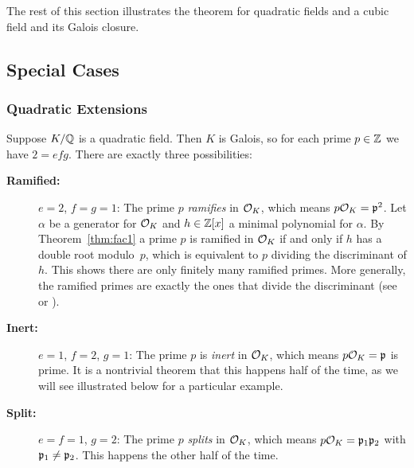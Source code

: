 The rest of this section illustrates the theorem for quadratic fields
and a cubic field and its Galois closure.

\subsection{Special Cases}

\subsubsection*{Quadratic Extensions}

Suppose $K/\mathbb{Q}$ is a quadratic field.  Then $K$ is Galois, so for each prime $p\in\mathbb{Z}$ we have
$2=efg$. There are exactly three possibilities:
\begin{description}
	\item[\bf{Ramified:}] $e=2$, $f=g=1$: The prime $p$ \emph{ramifies} in
	$\mathcal{O}_K$, which means $p\mathcal{O}_K = \mathfrak{p}^2$.  Let $\alpha$ be a generator for $\mathcal{O}_K$ and
	$h\in\mathbb{Z}[x]$ a minimal polynomial for $\alpha$.
	By Theorem~\ref{thm:fac1} a prime $p$ is ramified in $\mathcal{O}_K$ if and only if
	$h$ has a double root modulo~$p$, which is equivalent to $p$ dividing
	the discriminant of $h$. This shows there are only finitely many ramified
	primes. More generally, the ramified primes are exactly the
	ones that divide the discriminant (see \cite[Thm.~24]{marcus1977number}
	or \cite[Cor.~III.2.12]{neukirch1999}).

	\item[\bf{Inert}:] $e=1$, $f=2$, $g=1$: The prime $p$ is \emph{inert} in $\mathcal{O}_K$,
	which means $p\mathcal{O}_K = \mathfrak{p}$ is prime.  It is a nontrivial theorem that
	this happens half of the time,
	as we will see illustrated below for a particular example.

	\item[\bf{Split:}] $e=f=1$, $g=2$: The prime $p$ \emph{splits} in $\mathcal{O}_K$,
	which means $p\mathcal{O}_K = \mathfrak{p}_1\mathfrak{p}_2$ with $\mathfrak{p}_1\neq \mathfrak{p}_2$.  This happens the other
	half of the time.
\end{description}

